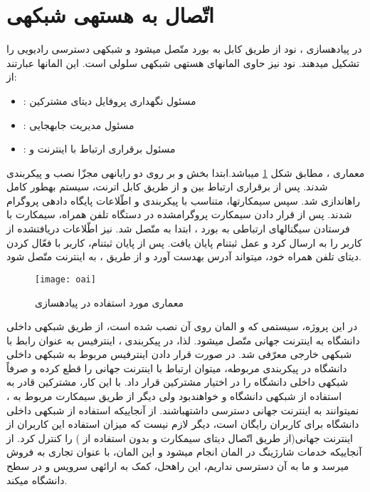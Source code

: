 \section{اتّصال  به هسته\nf ی شبکه\nf ی }

در پیاده\nf سازی ، نود  از طریق کابل  به بورد  متّصل می\nf شود و شبکه\nf ی دسترسی رادیویی را تشکیل می\nf دهند. نود  نیز حاوی المان\nf های هسته\nf ی شبکه\nf ی سلولی است. این المان\nf ها عبارتند از:
\begin{itemize}
\item {}: مسئول نگهداری پروفایل دیتای مشترکین
\item {}: مسئول مدیریت جابه\nf جایی
\item {}: مسئول برقراری ارتباط با اینترنت و 
\end{itemize}

معماری ، مطابق شکل \ref{oai} می\nf باشد.ابتدا بخش  و  بر روی دو رایانه\nf ی مجزّا نصب و پیکربندی شدند. پس از برقراری ارتباط بین  و  از طریق کابل اترنت، سیستم به\nf طور کامل راه\nf اندازی شد. سپس سیم\nf کارت\nf ها، متناسب با پیکربندی و اطّلاعات پایگاه داده\nf ی  پروگرام شدند. پس از قرار دادن سیم\nf کارت پروگرام\nf شده در دستگاه تلفن همراه، سیم\nf کارت با فرستادن سیگنال\nf های ارتباطی به بورد ، ابتدا به  متّصل شد.  نیز اطّلاعات دریافت\nf شده از کاربر را به  ارسال کرد و عمل ثبت\nf نام پایان یافت. پس از پایان ثبت\nf نام، کاربر با فعّال کردن دیتای تلفن همراه خود، می\nf تواند آدرس  به\nf دست آورد و  از طریق ، به اینترنت متّصل شود.

\begin{figure}[H]
\centering
\texttt{[image: oai]}
\caption{معماری مورد استفاده در پیاده\nf سازی }
\label{oai}
\end{figure}

در این پروژه، سیستمی که  و المان  روی آن نصب شده است، از طریق شبکه\nf ی داخلی دانشگاه به اینترنت جهانی متّصل می\nf شود. لذا، در پیکربندی ، اینترفیس  به عنوان رابط  با شبکه\nf ی خارجی معرّفی شد. در صورت قرار دادن اینترفیس مربوط به شبکه\nf ی داخلی دانشگاه در پیکربندی مربوطه، می\nf توان ارتباط  با اینترنت جهانی را قطع کرده و صرفاً شبکه\nf ی داخلی دانشگاه را در اختیار مشترکین قرار داد. با این کار، مشترکین قادر به استفاده از شبکه\nf ی دانشگاه و  خواهندبود ولی دیگر از طریق سیم\nf کارت مربوط به ، نمی\nf توانند به اینترنت جهانی دسترسی داشته\nf باشند. از آنجایی\nf که استفاده از شبکه\nf ی داخلی دانشگاه برای کاربران رایگان است، دیگر لازم نیست که میزان استفاده این کاربران از اینترنت جهانی(از طریق اتّصال دیتای سیم\nf کارت و بدون استفاده از ) را کنترل کرد. از آنجایی\nf که خدمات شارژینگ در المان  انجام می\nf شود و این المان، با عنوان تجاری  به فروش می\nf رسد و ما به آن دسترسی نداریم، این راه\nf حل، کمک به ارائه\nf ی سرویس  و  در سطح دانشگاه می\nf کند.


